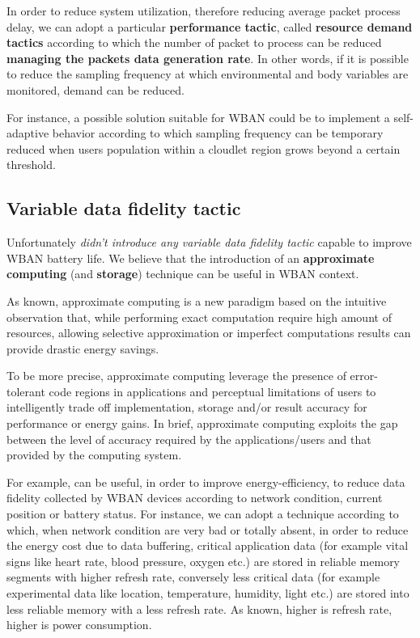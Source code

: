 \documentclass[sigchi]{acmart}
\begin{document}
In order to reduce system utilization, therefore reducing average packet process delay, we can adopt a particular \textbf{performance tactic}, called \textbf{resource demand tactics} according to which the number of packet to process can be reduced \textbf{managing the packets data generation rate}. In other words, if it is possible to reduce the sampling frequency at which environmental and body variables are monitored, demand can be reduced.\cite{BassSoftwareArchitecture2003} 

For instance, a possible solution suitable for WBAN could be to implement a self-adaptive behavior according to which sampling frequency can be temporary reduced when users population within a cloudlet region grows beyond a certain threshold.


\subsection{Variable data fidelity tactic}

Unfortunately \citet{MSAReport} \textit{didn't introduce any variable data fidelity tactic} capable to improve WBAN battery life. We believe that the introduction of an \textbf{approximate computing} (and \textbf{storage}) technique can be useful in WBAN context. 

As known, approximate computing is a new paradigm based on the intuitive observation that, while performing exact computation require high amount of resources, allowing selective approximation or imperfect computations results can provide drastic energy savings.

To be more precise, approximate computing leverage the presence of error-tolerant code regions in applications and perceptual limitations of users to intelligently trade off implementation, storage and/or result accuracy for performance or energy gains. In brief, approximate computing exploits the gap between the level of accuracy required by the applications/users and that provided by the computing system.

For example, can be useful, in order to improve energy-efficiency, to reduce data fidelity collected by WBAN devices according to network condition, current position or battery status. For instance, we can adopt a technique according to which, when network condition are very bad or totally absent, in order to reduce the energy cost due to data buffering, critical application data (for example vital signs like heart rate, blood pressure, oxygen etc.) are stored in reliable memory segments with higher refresh rate, conversely less critical data (for example experimental data like location, temperature, humidity, light etc.) are stored into less reliable memory with a less refresh rate. As known, higher is refresh rate, higher is power consumption.\cite{Towards}
\end{document}
